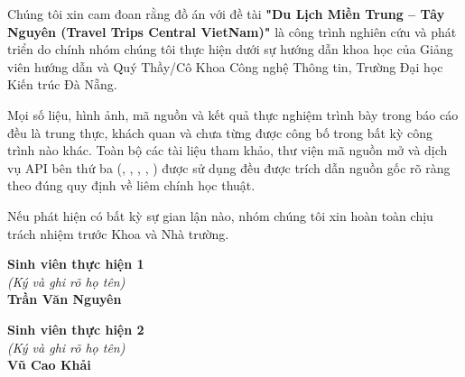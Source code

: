 \begin{declaration}
Chúng tôi xin cam đoan rằng đồ án với đề tài \textbf{"Du Lịch Miền Trung -- Tây Nguyên (Travel Trips Central VietNam)"} là công trình nghiên cứu và phát triển do chính nhóm chúng tôi thực hiện dưới sự hướng dẫn khoa học của Giảng viên hướng dẫn và Quý Thầy/Cô Khoa Công nghệ Thông tin, Trường Đại học Kiến trúc Đà Nẵng.

Mọi số liệu, hình ảnh, mã nguồn và kết quả thực nghiệm trình bày trong báo cáo đều là trung thực, khách quan và chưa từng được công bố trong bất kỳ công trình nào khác. Toàn bộ các tài liệu tham khảo, thư viện mã nguồn mở và dịch vụ API bên thứ ba (, , , , ) được sử dụng đều được trích dẫn nguồn gốc rõ ràng theo đúng quy định về liêm chính học thuật.

Nếu phát hiện có bất kỳ sự gian lận nào, nhóm chúng tôi xin hoàn toàn chịu trách nhiệm trước Khoa và Nhà trường.

\vspace{1.5cm}
\noindent\begin{minipage}[t]{0.48\textwidth}
\centering
\textbf{Sinh viên thực hiện 1}\\[0.2cm]
\textit{(Ký và ghi rõ họ tên)}\\[2.2cm]
\textbf{Trần Văn Nguyên}
\end{minipage}
\hfill
\begin{minipage}[t]{0.48\textwidth}
\centering
\textbf{Sinh viên thực hiện 2}\\[0.2cm]
\textit{(Ký và ghi rõ họ tên)}\\[2.2cm]
\textbf{Vũ Cao Khải}
\end{minipage}
\end{declaration}
